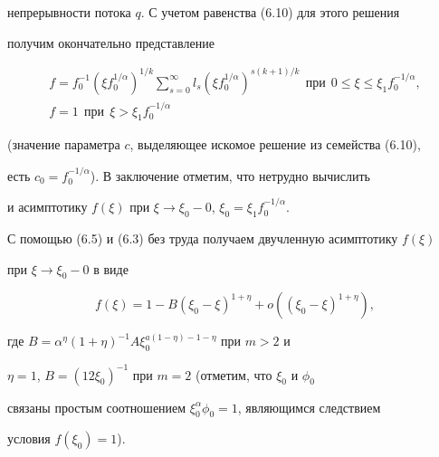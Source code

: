 непрерывности потока $q$. С учетом равенства (6.10) для этого решения 


получим окончательно представление 


\begin{gather*} 


f=f_0^{-1}(\xi f_0^{1/\alpha})^{1/k}\sum^\infty_{s=0}l_s 


(\xi f_0^{1/\alpha})^{s(k+1)/k}\ \ \text{при} 


\ \ 0\le\xi\le\xi_1f_0^{-1/\alpha},\\ 


f=1\ \ \text{при}\ \ \xi>\xi_1f_0^{-1/\alpha} 


\end{gather*} 


(значение параметра $c$, выделяющее искомое решение из семейства (6.10), 


есть $c_0=f_0^{-1/\alpha}$). В заключение отметим, что нетрудно вычислить 


и асимптотику $f(\xi)$ при $\xi\to\xi_0-0$, $\xi_0=\xi_1f_0^{-1/\alpha}$. 


С помощью (6.5) и (6.3) без труда получаем двучленную асимптотику $f(\xi)$ 


при $\xi\to\xi_0-0$ в виде 


$$ 


f(\xi)=1-B(\xi_0-\xi)^{1+\eta}+o((\xi_0-\xi)^{1+\eta}), 


$$ 


где $B=\alpha^\eta(1+\eta)^{-1}A \xi_0^{a(1-\eta)-1-\eta}$ при $m>2$ и 


$\eta=1$, $B=(12\xi_0)^{-1}$ при $m=2$ (отметим, что $\xi_0$ и $\phi_0$ 


связаны простым соотношением $\xi^\alpha_0\phi_0=1$, являющимся следствием 


условия $f(\xi_0)=1$). 


 



